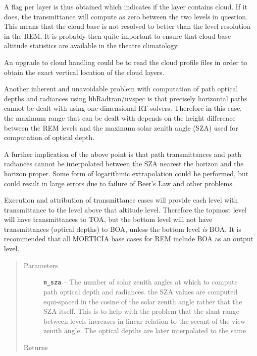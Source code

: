 \documentclass[a4paper,10pt,english]{sphinxmanual}
\begin{document}
\begin{fulllineitems}
\begin{fulllineitems}
A flag per layer is thus obtained which indicates if the layer contains cloud. If it does, the transmittance
will compute as zero between the two levels in question. This means that the cloud base is not resolved
to better than the level resolution in the REM. It is probably then quite important to ensure that
cloud base altitude statistics are available in the theatre climatology.

An upgrade to cloud handling could be to read the cloud profile files in order to obtain the exact vertical
location of the cloud layers.

Another inherent and unavoidable problem with computation of path optical depths and radiances using
libRadtran/uvspec is that precisely horizontal paths cannot be dealt with using one-dimensional RT
solvers. Therefore in this case, the maximum range that can be dealt with depends on the height difference
between the REM levels and the maximum solar zenith angle (SZA) used for computation of optical depth.

A further implication of the above point is that path transmittances and path radiances cannot be interpolated
between the SZA nearest the horizon and the horizon proper. Some form of logarithmic extrapolation could be
performed, but could result in large errors due to failure of Beer's Law and other problems.

Execution and attribution of transmittance cases will provide each level with transmittance to the level
above that altitude level. Therefore the topmost level will have transmittances to TOA, but the
bottom level will not have transmittances (optical depths) to BOA, unless the bottom level \emph{is} BOA.
It is recommended that all MORTICIA base cases for REM include BOA as an output level.
\begin{quote}\begin{description}
\item[{Parameters}] \leavevmode
\textbf{\texttt{n\_sza}} -- The number of solar zenith angles at which to compute path optical depth and radiances.
the SZA values are computed equi-spaced in the cosine of the solar zenith angle rather that the
SZA itself. This is to help with the problem that the slant range between levels increases
in linear relation to the secant of the view zenith angle. The optical depths are later
interpolated to the same

\item[{Returns}] \leavevmode


\end{description}\end{quote}


\end{fulllineitems}
\end{fulllineitems}
\end{document}
